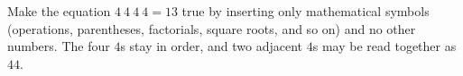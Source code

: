 Make the equation $4\ 4\ 4\ 4=13$ true by inserting only mathematical symbols (operations, parentheses, factorials, square roots, and so on) and no other numbers. The four $4$s stay in order, and two adjacent $4$s may be read together as $44$.
